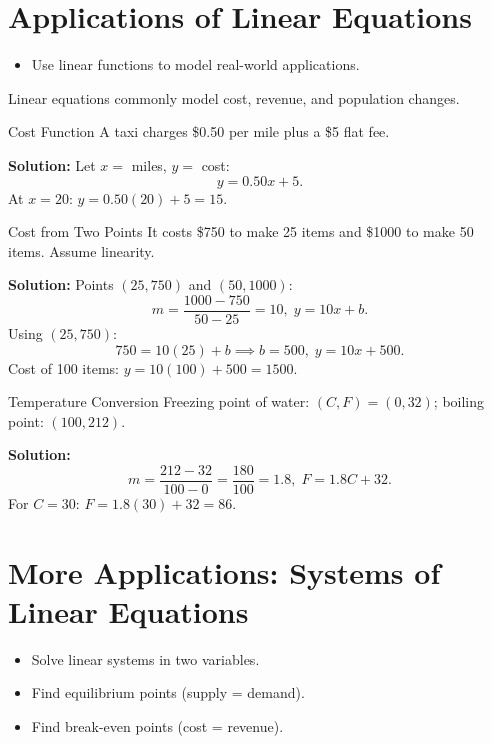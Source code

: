 \section{Applications of Linear Equations}
\begin{outcome}
\begin{itemize}
\item Use linear functions to model real-world applications.
\end{itemize}
\end{outcome}

Linear equations commonly model cost, revenue, and population changes.

\begin{example}{Cost Function}\label{exa:cost-function}
A taxi charges \$0.50 per mile plus a \$5 flat fee.

\textbf{Solution:} Let $x=$ miles, $y=$ cost:
\[
y=0.50x+5.
\]
At $x=20$: $y=0.50(20)+5=15.$
\end{example}

\begin{example}{Cost from Two Points}\label{exa:cost-two-points}
It costs \$750 to make 25 items and \$1000 to make 50 items. Assume linearity.

\textbf{Solution:} Points $(25,750)$ and $(50,1000)$:
\[
m=\frac{1000-750}{50-25}=10,\;y=10x+b.
\]
Using $(25,750)$:
\[
750=10(25)+b \implies b=500,\;y=10x+500.
\]
Cost of 100 items: $y=10(100)+500=1500.$
\end{example}

\begin{example}{Temperature Conversion}\label{exa:temp-conversion}
Freezing point of water: $(C,F)=(0,32)$; boiling point: $(100,212)$.

\textbf{Solution:}
\[
m=\frac{212-32}{100-0}=\frac{180}{100}=1.8,\;F=1.8C+32.
\]
For $C=30$: $F=1.8(30)+32=86.$
\end{example}

\section{More Applications: Systems of Linear Equations}
\begin{outcome}
\begin{itemize}
\item Solve linear systems in two variables.
\item Find equilibrium points (supply = demand).
\item Find break-even points (cost = revenue).
\end{itemize}
\end{outcome}

